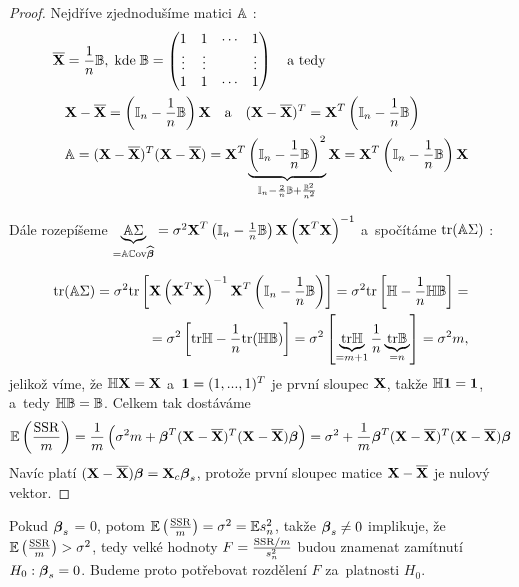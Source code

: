 \begin{proof}
Nejdříve zjednodušíme matici $\mathbb{A}$ :
\begin{align*}
	\overline{\textbf{X}} & = \frac{1}{n} \mathbb{B}, \; \text{kde} \; \mathbb{B} = \begin{pmatrix}
	1 & 1 & \cdots & 1 \\
	\vdots & \vdots & & \vdots \\
	1 & 1 & \cdots & 1
	\end{pmatrix} \quad \text{a tedy} \\
	& \textbf{X} - \overline{\textbf{X}} = \left(\mathbb{I}_{n} - \frac{1}{n} \mathbb{B} \right) \textbf{X} \quad \text{a} \quad (\textbf{X} - \overline{\textbf{X}})^T = \textbf{X}^T \left(\mathbb{I}_{n} - \frac{1}{n} \mathbb{B} \right) \\
	& \mathbb{A} = (\textbf{X} - \overline{\textbf{X}})^T(\textbf{X} - \overline{\textbf{X}}) = \textbf{X}^T \underbrace{\left(\mathbb{I}_{n} - \frac{1}{n} \mathbb{B} \right)^2}_{\mathbb{I}_{n} - \frac{2}{n} \mathbb{B} + \frac{\mathbb{B}^2}{n^2}} \textbf{X} = \textbf{X}^T \left(\mathbb{I}_{n} - \frac{1}{n} \mathbb{B} \right) \textbf{X}
\end{align*}

Dále rozepíšeme $\underbrace{\mathbb{A} \Sigma}_{ = \mathbb{A} \mathbb{C}\mathrm{ov} \widehat{\boldsymbol{\beta}}} = \sigma^2 \textbf{X}^T \left(\mathbb{I}_{n} - \frac{1}{n} \mathbb{B} \right) \textbf{X} \left(\textbf{X}^T \textbf{X} \right)^{-1}$ a~spočítáme $\text{tr} (\mathbb{A} \Sigma)$ :

\begin{equation*}
\begin{split}
\text{tr} (\mathbb{A} \Sigma) = \sigma^2 \text{tr} \left[\textbf{X} \left(\textbf{X}^T \textbf{X} \right)^{-1} \textbf{X}^T \left(\mathbb{I}_{n} - \frac{1}{n} \mathbb{B} \right) \right] = \sigma^2 \text{tr}\left[\mathbb{H} - \frac{1}{n} \mathbb{H} \mathbb{B} \right] = \\ = \sigma^2 \left[\text{tr} \mathbb{H} - \frac{1}{n} \text{tr} (\mathbb{H} \mathbb{B}) \right] = \sigma^2 \left[\underbrace{\text{tr} \mathbb{H}}_{ = m+1} \frac{1}{n} \underbrace{\text{tr} \mathbb{B}}_{ = n} \right] = \sigma^2 m,
\end{split}
\end{equation*}
jelikož víme, že $\mathbb{H} \textbf{X} = \textbf{X}$ a~$\mathbf{1} = (1,..., 1)^T$ je první sloupec $\textbf{X}$, takže $\mathbb{H} \mathbf{1} = \mathbf{1}$, a~tedy $\mathbb{H} \mathbb{B} = \mathbb{B}$. Celkem tak dostáváme
 $$
\mathbb{E} \left(\frac{\mathrm{SSR}}{m} \right) = \frac{1}{m} \left(\sigma^2 m + \boldsymbol{\beta}^T (\textbf{X} - \overline{\textbf{X}})^T(\textbf{X} - \overline{\textbf{X}}) \boldsymbol{\beta} \right) = \sigma^2 + \frac{1}{m} \boldsymbol{\beta}^T (\textbf{X} - \overline{\textbf{X}})^T(\textbf{X} - \overline{\textbf{X}}) \boldsymbol{\beta}
 $$
Navíc platí $(\textbf{X} - \overline{\textbf{X}}) \boldsymbol{\beta} = \textbf{X}_c \boldsymbol{\beta}_s$, protože první sloupec matice $\textbf{X} - \overline{\textbf{X}}$ je nulový vektor.
\end{proof}

\begin{remark}
Pokud $\boldsymbol{\beta}_s$ = 0, potom $\mathbb{E} \left(\frac{\mathrm{SSR}}{m} \right) = \sigma^2 = \mathbb{E} s_n^2$, takže $\boldsymbol{\beta}_s \neq 0$ implikuje, že $\mathbb{E} \left(\frac{\mathrm{SSR}}{m} \right) > \sigma^2$, tedy velké hodnoty $F = \frac{\mathrm{SSR}/m}{s_n^2}$ budou znamenat zamítnutí $H_0: \boldsymbol{\beta}_s = 0$. Budeme proto potřebovat rozdělení $F$ za~platnosti $H_0$.
\end{remark}


